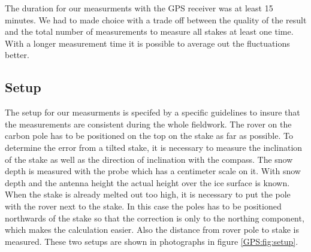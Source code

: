 The duration for our measurments with the GPS receiver was at least 15 minutes. 
We had to made choice with a trade off between the quality of the result and the total number of measurements to measure all stakes at least one time. 
With a longer measurement time it is possible to average out the fluctuations better.


\subsection{Setup}

The setup for our measurments is specifed by a specific guidelines to insure that the measurements are consistent during the whole fieldwork.
The rover on the carbon pole has to be positioned on the top on the stake as far as possible. 
To determine the error from a tilted stake, it is necessary to measure the inclination of the stake as well as the direction of inclination with the compass.
The snow depth is measured with the probe which has a centimeter scale on it.
With snow depth and the antenna height the actual height over the ice surface is known. 
When the stake is already melted out too high, it is necessary to put the pole with the rover next to the stake. 
In this case the poles has to be positioned northwards of the stake so that the correction is only to the northing component, which makes the calculation easier. 
Also the distance from rover pole to stake is measured.
These two setups are shown in photographs in figure \ref{GPS:fig:setup}.

